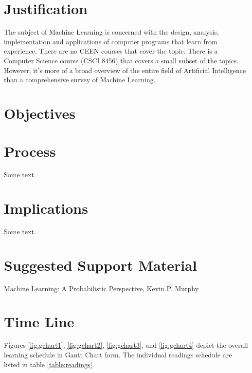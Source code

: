 \documentclass[12pt]{article}
\begin{document}
\newpage


\section{Justification}

The subject of Machine Learning is concerned with the design, analysis, implementation
and applications of computer programs that learn from experience. There are no CEEN courses
that cover the topic. There is a Computer Science course (CSCI 8456) that covers a small subset
of the topics. However, it's more of a broad overview of the entire field of Artificial
Intelligence than a comprehensive survey of Machine Learning. 

\section{Objectives}



\section{Process}

Some text.

\section{Implications}

Some text.

\section{Suggested Support Material}

Machine Learning: A Probabilistic Perspective, Kevin P. Murphy

\section{Time Line}

Figures \ref{fig:gchart1}, \ref{fig:gchart2}, \ref{fig:gchart3}, and \ref{fig:gchart4} depict the
overall learning schedule in Gantt Chart form. The individual readings schedule are listed in table
\ref{table:readings}.
\end{document}
